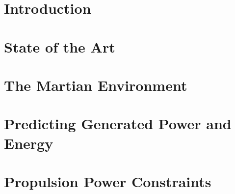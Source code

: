 \documentclass[%
    draft, %
    11pt,
    a4paper
]
{memoir}
\begin{document}

\chapter{Introduction}
\label{sec:Introduction}


\chapter{State of the Art}
\label{sec:StateOfTheArt}



\chapter{The Martian Environment}
\label{sec:MartianEnvironment}


\chapter{Predicting Generated Power and Energy}
\label{sec:PowerAndEnergyPredictions}


\chapter{Propulsion Power Constraints}
\label{sec:PropulsionPowerConstraints}

\end{document}

